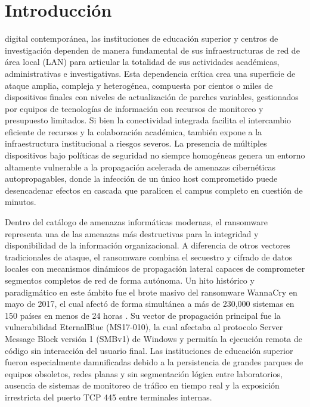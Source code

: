 \section{Introducción}
\label{sec:introduccion}
 digital contemporánea, las instituciones de educación superior y centros de investigación dependen de manera fundamental de sus infraestructuras de red de área local (LAN) para articular la totalidad de sus actividades académicas, administrativas e investigativas. Esta dependencia crítica crea una superficie de ataque amplia, compleja y heterogénea, compuesta por cientos o miles de dispositivos finales con niveles de actualización de parches variables, gestionados por equipos de tecnologías de información con recursos de monitoreo y presupuesto limitados. Si bien la conectividad integrada facilita el intercambio eficiente de recursos y la colaboración académica, también expone a la infraestructura institucional a riesgos severos. La presencia de múltiples dispositivos bajo políticas de seguridad no siempre homogéneas genera un entorno altamente vulnerable a la propagación acelerada de amenazas cibernéticas autopropagables, donde la infección de un único host comprometido puede desencadenar efectos en cascada que paralicen el campus completo en cuestión de minutos.

Dentro del catálogo de amenazas informáticas modernas, el ransomware representa una de las amenazas más destructivas para la integridad y disponibilidad de la información organizacional. A diferencia de otros vectores tradicionales de ataque, el ransomware combina el secuestro y cifrado de datos locales con mecanismos dinámicos de propagación lateral capaces de comprometer segmentos completos de red de forma autónoma. Un hito histórico y paradigmático en este ámbito fue el brote masivo del ransomware WannaCry en mayo de 2017, el cual afectó de forma simultánea a más de 230,000 sistemas en 150 países en menos de 24 horas \cite{ghenimi2020wannacry}. Su vector de propagación principal fue la vulnerabilidad EternalBlue (MS17-010), la cual afectaba al protocolo Server Message Block versión 1 (SMBv1) de Windows y permitía la ejecución remota de código sin interacción del usuario final. Las instituciones de educación superior fueron especialmente damnificadas debido a la persistencia de grandes parques de equipos obsoletos, redes planas y sin segmentación lógica entre laboratorios, ausencia de sistemas de monitoreo de tráfico en tiempo real y la exposición irrestricta del puerto TCP 445 entre terminales internas.

